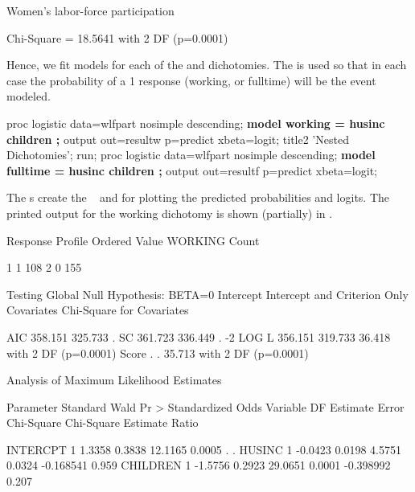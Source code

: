 \begin{Example}[wlfpart]{Women's labor-force participation}
\begin{Output}[htb]
\begin{output}
             Chi-Square = 18.5641 with 2 DF (p=0.0001)
\end{output}
\end{Output}

Hence, we fit models for each of the  and 
dichotomies.  The  is used so that in each
case the probability of a 1 response (working, or fulltime) will be
the event modeled.

\begin{listing}
proc logistic data=wlfpart nosimple descending;
   {\bf model working = husinc children ;}
   output out=resultw p=predict xbeta=logit;
   title2 'Nested Dichotomies';
run;
proc logistic data=wlfpart nosimple descending;
   {\bf model fulltime = husinc children ;}
   output out=resultf p=predict xbeta=logit;
\end{listing}

The s  create the \Dsets\  and
 for plotting the predicted probabilities and logits.
The printed output for the working dichotomy is shown (partially)
in .

\begin{Output}[htb]
\caption{Women's labor-force data, analysis of the working/not working dichotomy}\label{out:wlfpart.2}
\small
\begin{output}
                               Response Profile
                          Ordered
                            Value  WORKING     Count

                                1        1       108
                                2        0       155

                  Testing Global Null Hypothesis: BETA=0
                            Intercept
               Intercept       and
   Criterion     Only      Covariates    Chi-Square for Covariates

   AIC           358.151      325.733      .
   SC            361.723      336.449      .
   -2 LOG L      356.151      319.733    36.418 with 2 DF (p=0.0001)
   Score            .            .       35.713 with 2 DF (p=0.0001)

                    Analysis of Maximum Likelihood Estimates

               Parameter Standard    Wald       Pr >    Standardized    Odds
   Variable DF  Estimate   Error  Chi-Square Chi-Square   Estimate     Ratio

   INTERCPT 1     1.3358   0.3838    12.1165     0.0005            .    .
   HUSINC   1    -0.0423   0.0198     4.5751     0.0324    -0.168541   0.959
   CHILDREN 1    -1.5756   0.2923    29.0651     0.0001    -0.398992   0.207
\end{output}
\end{Output}


\end{Example}
